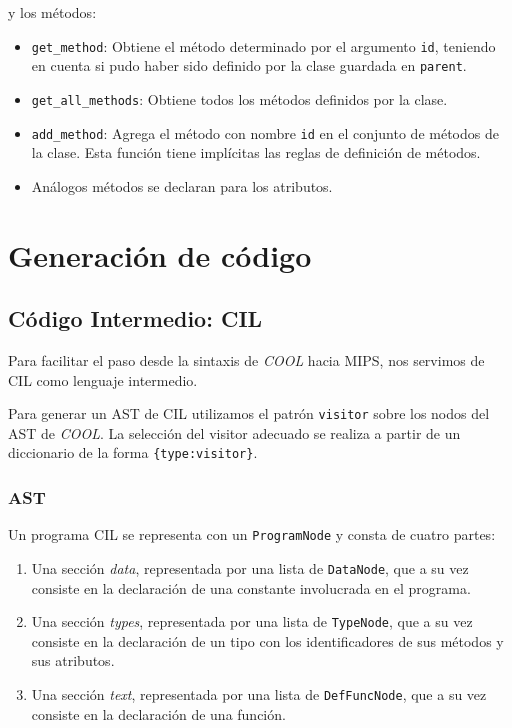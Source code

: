 \documentclass[a4paper,10pt,twocolumn]{article}
\begin{document}
y los métodos: 

\begin{itemize}
	\item \lstinline|get_method|: Obtiene el método determinado por el argumento \lstinline|id|, teniendo en cuenta si pudo haber sido definido por la clase guardada en \lstinline|parent|. 
	\item \lstinline|get_all_methods|: Obtiene todos los métodos definidos por la clase. 
	\item \lstinline|add_method|: Agrega el método con nombre \lstinline|id| en el conjunto de métodos de la clase. Esta función tiene implícitas las reglas de definición de métodos. 
	\item Análogos métodos se declaran para los atributos. 
\end{itemize}

\section{Generación de código}

\subsection{Código Intermedio: CIL}
Para facilitar el paso desde la sintaxis de \textit{COOL} hacia MIPS, nos servimos de CIL como lenguaje intermedio. 

Para generar un AST de CIL utilizamos el patrón \lstinline|visitor| sobre los nodos del AST de \textit{COOL}. La selección del visitor adecuado se realiza a partir de un diccionario de la forma \lstinline|{type:visitor}|.

\subsubsection{AST}

Un programa CIL se representa con un \lstinline|ProgramNode| y consta de cuatro partes:

\begin{enumerate}
	\item Una sección \textit{data}, representada por una lista de \lstinline|DataNode|, que a su vez consiste en la declaración de una constante involucrada en el programa. 
	\item Una sección \textit{types}, representada por una lista de \lstinline|TypeNode|, que a su vez consiste en la declaración de un tipo con los identificadores de sus métodos y sus atributos. 
	\item Una sección \textit{text}, representada por una lista de \lstinline|DefFuncNode|, que a su vez consiste en la declaración de una función.
\end{enumerate}
\end{document}
